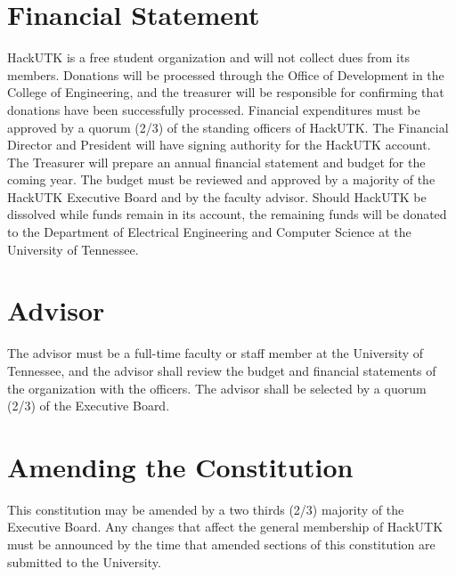 \documentclass[12pt]{article}
\begin{document}
\section*{Financial Statement}
HackUTK is a free student organization and will not collect dues from its members. Donations will be processed through the Office of Development in the College of Engineering, and the treasurer will be responsible for confirming that donations have been successfully processed. Financial expenditures must be approved by a quorum (2/3) of the standing officers of HackUTK. The Financial Director and President will have signing authority for the HackUTK account. The Treasurer will prepare an annual financial statement and budget for the coming year. The budget must be reviewed and approved by a majority of the HackUTK Executive Board and by the faculty advisor. Should HackUTK be dissolved while funds remain in its account, the remaining funds will be donated to the Department of Electrical Engineering and Computer Science at the University of Tennessee.

\section{Advisor}
The advisor must be a full-time faculty or staff member at the University of Tennessee, and the advisor shall review the budget and financial statements of the organization with the officers. The advisor shall be selected by a quorum (2/3) of the Executive Board.

\section{Amending the Constitution}
This constitution may be amended by a two thirds (2/3) majority of the Executive
Board. Any changes that affect the general membership of HackUTK must be
announced by the time that amended sections of this constitution are submitted to the University.
\end{document}
